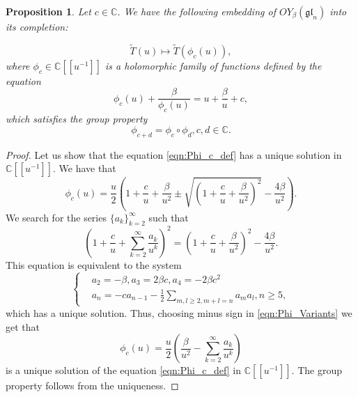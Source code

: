 \documentclass[10pt]{article}%
\numberwithin{equation}{section}
\newtheorem{prop}[thm]{Proposition}
\newcommand{\red}{\color{red}}
\newcommand{\gl}{{\mathfrak{gl}}}
\begin{document}
\begin{prop}
Let  $c\in\mathbb{C}$. We have the following embedding of $OY_{\beta}(\gl_n)$ into its completion:

\begin{equation}
\tilde{T}(u)\mapsto \tilde{T}(\phi_c(u)),
\end{equation}
where $\phi_c\in \mathbb{C}[[u^{-1}]]$ is a holomorphic family of functions defined by the equation
\begin{equation}\label{eqn:Phi_c_def}
\phi_c(u)+\frac{\beta}{\phi_c(u)}=u+\frac{\beta}{u}+c, 
\end{equation}
which satisfies the group property
\[
\phi_{c+d}=\phi_c\circ\phi_d, c,d\in \mathbb{C}.
\]
\end{prop}
\begin{proof}

Let us show that the equation \eqref{eqn:Phi_c_def} has a unique solution in $\mathbb{C}[[u^{-1}]]$. We have that 
\begin{equation}
\phi_c(u)=\frac{u}{2}\left(1+\frac{c}{u}+\frac{\beta}{u^2}\pm\sqrt{(1+\frac{c}{u}+\frac{\beta}{u^2})^2}-\frac{4\beta}{u^2}\right).\label{eqn:Phi_Variants}
\end{equation}
We search for the series $\{a_k\}_{k=2}^{\infty}$ such that
\[
\left(1+\frac{c}{u}+\sum\limits_{k=2}^{\infty}\frac{a_k}{u^k}\right)^2=\left(1+\frac{c}{u}+\frac{\beta}{u^2}\right)^2-\frac{4\beta}{u^2}.
\]
This equation is equivalent to the system
\begin{equation}
    \left\{
\begin{array}{cc}
     &a_2 = -\beta ,a_3 =2\beta c, a_4 = -2\beta c^2\\
     &a_n = -c a_{n-1}-\frac{1}{2}\sum\limits_{m,l\geq 2, m+l=n} a_m a_l,n\geq 5,
\end{array}
    \right.
\end{equation}
which has a unique solution. Thus, choosing minus sign in \eqref{eqn:Phi_Variants} we get that
\begin{equation}
   \phi_c(u)= \frac{u}{2}\left(\frac{\beta}{u^2}-\sum\limits_{k=2}^{\infty}\frac{a_k}{u^k}\right)
\end{equation}
is a unique solution of the equation \eqref{eqn:Phi_c_def} in $\mathbb{C}[[u^{-1}]]$. The group property follows from 
 the uniqueness.


    
\end{proof}
\end{document}
